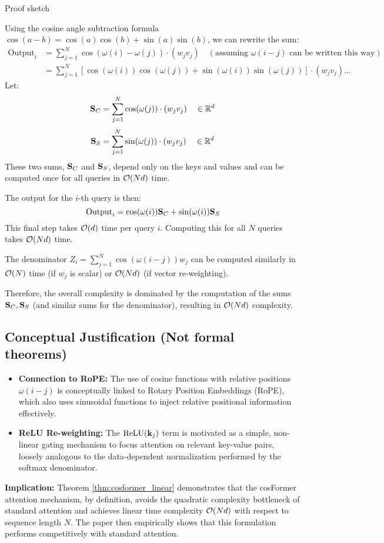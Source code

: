 \documentclass[aspectratio=169]{beamer}
\begin{document}
\begin{frame}[shrink=30]{Proof sketch}

	Using the cosine angle subtraction formula $\cos(a-b) = \cos(a)\cos(b) +
	\sin(a)\sin(b)$, we can rewrite the sum:
	\begin{align*} \label{eq:cos_decomp}
		\text{Output}_i & = \sum_{j=1}^{N} \cos(\omega(i) - \omega(j)) \cdot (w_j v_j) \quad (\text{assuming } \omega(i-j) \text{ can be written this way}) \\
		                & = \sum_{j=1}^{N} [\cos(\omega(i))\cos(\omega(j)) + \sin(\omega(i))\sin(\omega(j))] \cdot (w_j v_j)...
	\end{align*}
	Let:
	$$ \mathbf{S}_C = \sum_{j=1}^{N} \cos(\omega(j)) \cdot (w_j v_j) \quad \in \mathbb{R}^d $$
	$$ \mathbf{S}_S = \sum_{j=1}^{N} \sin(\omega(j)) \cdot (w_j v_j) \quad \in \mathbb{R}^d $$
	These two sums, $\mathbf{S}_C$ and $\mathbf{S}_S$, depend only on the keys and values and can be computed once for all queries in $\mathcal{O}(Nd)$ time.

	The output for the $i$-th query is then: $$ \text{Output}_i = \cos(\omega(i))
	\mathbf{S}_C + \sin(\omega(i)) \mathbf{S}_S $$ This final step takes $\mathcal{O}(d)$
	time per query $i$. Computing this for all $N$ queries takes $\mathcal{O}(Nd)$ time.

	The denominator $Z_i = \sum_{j=1}^{N} \cos(\omega(i-j)) w_j$ can be computed
	similarly in $\mathcal{O}(N)$ time (if $w_j$ is scalar) or $\mathcal{O}(Nd)$ (if vector
	re-weighting).

	Therefore, the overall complexity is dominated by the computation of the sums
	$\mathbf{S}_C, \mathbf{S}_S$ (and similar sums for the denominator), resulting in
	$\mathcal{O}(Nd)$ complexity.

\end{frame}

\begin{frame}
	\subsection*{Conceptual Justification (Not formal theorems)}
	\begin{itemize}
		\item \textbf{Connection to RoPE:} The use of cosine functions with relative positions $\omega(i-j)$ is conceptually linked to Rotary Position Embeddings (RoPE), which also uses sinusoidal functions to inject relative positional information effectively.
		\item \textbf{ReLU Re-weighting:} The $\text{ReLU}(\mathbf{k}_j)$ term is motivated as a simple, non-linear gating mechanism to focus attention on relevant key-value pairs, loosely analogous to the data-dependent normalization performed by the softmax denominator.
	\end{itemize}

	\textbf{Implication:} Theorem \ref{thm:cosformer_linear} demonstrates that the cosFormer attention mechanism, by definition, avoids the quadratic complexity bottleneck of standard attention and achieves linear time complexity $\mathcal{O}(Nd)$ with respect to sequence length $N$. The paper then empirically shows that this formulation performs competitively with standard attention.
\end{frame}
\end{document}
